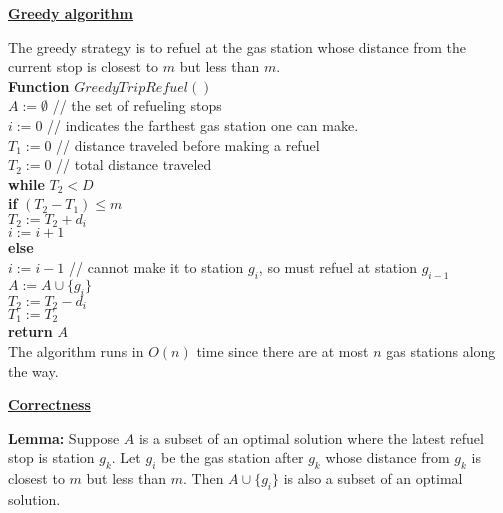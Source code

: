 \documentclass[11pt]{article}
\begin{document}
\begin{enumerate}
\underline{\textbf{Greedy algorithm}}

The greedy strategy is to refuel at the gas station whose distance
from the current stop is closest to $m$ but less than $m$.\\

\textbf{Function} $GreedyTripRefuel()$\\
\-\hspace{3em} $A := \emptyset$ // the set of refueling stops\\
\-\hspace{3em} $i := 0$ // indicates the farthest gas station one can
make.\\
\-\hspace{3em} $T_1 := 0$ // distance traveled before making a
refuel\\
\-\hspace{3em} $T_2 := 0$ // total distance traveled \\
\-\hspace{3em} \textbf{while} $T_2 < D$ \\
\-\hspace{5em} \textbf{if} $(T_2 - T_1) \leq m$ \\
\-\hspace{7em} $T_2 := T_2 + d_i$ \\
\-\hspace{7em} $i := i + 1$ \\
\-\hspace{5em} \textbf{else} \\
\-\hspace{7em} $i := i - 1$ // cannot make it to station $g_i$, so
must refuel at station $g_{i-1}$\\ 
\-\hspace{7em} $A := A \cup \{g_i\}$ \\
\-\hspace{7em} $T_2 := T_2 - d_i$ \\
\-\hspace{7em} $T_1 := T_2$ \\
\-\hspace{3em} \textbf{return} $A$ \\

The algorithm runs in $O(n)$ time since there are at most $n$ gas
stations along the way.

\underline{\textbf{Correctness}}

\textbf{Lemma:} Suppose $A$ is a subset of an optimal solution where
the latest refuel stop is station $g_k$. Let $g_i$ be the gas station
after $g_k$ whose distance from $g_k$ is closest to $m$ but less than
$m$. Then $A \cup \{g_i\}$ is also a subset of an optimal solution.


\end{enumerate}
\end{document}
